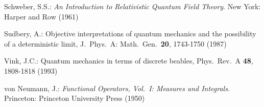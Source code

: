 \documentclass[12pt]{article}
\newcommand{\1}{\mathbf{1}} %
\begin{document}
\begin{thebibliography}{28.}

 Schweber, S.S.: \textit{An Introduction to
   Relativistic Quantum Field Theory}. New York: Harper and Row (1961)

 Sudbery, A.: Objective interpretations of quantum
   mechanics and the possibility of a deterministic limit, J.\ Phys.\
   A: Math.\ Gen.\ \textbf{20}, 1743-1750 (1987)


 Vink, J.C.: Quantum mechanics in terms of discrete
   beables, Phys.\ Rev.\ A \textbf{48}, 1808-1818 (1993)

 von Neumann, J.: \textit{Functional
   Operators, Vol.\ I: Measures and Integrals}. Princeton: Princeton
   University Press (1950)


\end{thebibliography}
\end{document}

